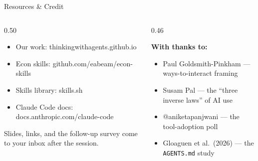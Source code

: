 \documentclass[aspectratio=169, 10pt]{beamer}
\begin{document}
\begin{frame}[fragile]{Resources \& Credit}
\vskip2pt
\begin{columns}[T]
\begin{column}{0.50\textwidth}
\begin{tcolorbox}[keybox, title={\faLink\quad Go deeper}, top=3pt, bottom=3pt]
\small
\begin{itemize}\setlength{\itemsep}{2pt}
  \item Our work: {\scriptsize\ttfamily thinkingwithagents.github.io}
  \item Econ skills: {\scriptsize\ttfamily github.com/eabeam/econ-skills}
  \item Skills library: {\scriptsize\ttfamily skills.sh}
  \item Claude Code docs: {\scriptsize\ttfamily docs.anthropic.com/claude-code}
\end{itemize}
\end{tcolorbox}
\vskip3pt
\begin{tcolorbox}[accentbox, top=2pt, bottom=2pt]
\scriptsize Slides, links, and the follow-up survey come to your inbox after the session.
\end{tcolorbox}
\end{column}
\begin{column}{0.46\textwidth}
\begin{tcolorbox}[colback=PaleSage, colframe=SlateTeal!40, boxrule=0.5pt, left=5pt, right=5pt, top=3pt, bottom=3pt]
\scriptsize
\textbf{With thanks to:}
\begin{itemize}\setlength{\itemsep}{1pt}
  \item Paul Goldsmith-Pinkham --- ways-to-interact framing
  \item Susam Pal --- the ``three inverse laws'' of AI use
  \item @aniketapanjwani --- the tool-adoption poll
  \item Gloaguen et al.\ (2026) --- the \texttt{AGENTS.md} study
\end{itemize}
\end{tcolorbox}
\end{column}
\end{columns}
\end{frame}
\end{document}
